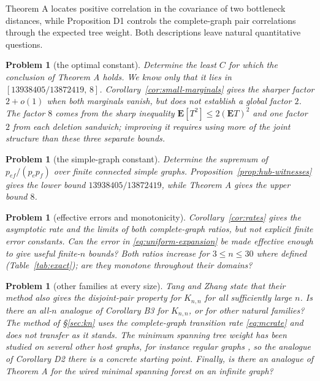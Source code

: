\documentclass[10pt,a4paper]{amsart}
\newtheorem{problem}[theorem]{Problem}
\newcommand{\E}{\mathbf{E}}
\begin{document}
Theorem A locates positive correlation in the covariance of two bottleneck
distances, while Proposition D1 controls the complete-graph pair correlations
through the expected tree weight. Both descriptions leave natural quantitative
questions.

\begin{problem}[the optimal constant]
Determine the least $C$ for which the conclusion of Theorem A holds. We know only
that it lies in $[13938405/13872419,\,8]$. Corollary~\ref{cor:small-marginals} gives
the sharper factor $2+o(1)$ when both marginals vanish, but does not establish a
global factor $2$. The factor $8$ comes from the sharp inequality
$\E[T^2]\le2(\E T)^2$ and one factor $2$ from each deletion sandwich; improving
it requires using more of the joint structure than these three separate bounds.
\end{problem}

\begin{problem}[the simple-graph constant]
Determine the supremum of $p_{ef}/(p_ep_f)$ over finite connected simple graphs.
Proposition~\ref{prop:hub-witnesses} gives the lower bound
$13938405/13872419$, while Theorem A gives the upper bound $8$.
\end{problem}

\begin{problem}[effective errors and monotonicity]
Corollary~\ref{cor:rates} gives the asymptotic rate and the limits of both
complete-graph ratios, but not explicit finite error constants. Can the error in
\eqref{eq:uniform-expansion} be made effective enough to give useful finite-$n$
bounds? Both ratios increase for $3\le n\le30$ where defined
(Table~\ref{tab:exact}); are they monotone throughout their domains?
\end{problem}

\begin{problem}[other families at every size]
Tang and Zhang \cite[Remark 1.2]{TZ} state that their method also gives the
disjoint-pair property for $K_{n,n}$ for all sufficiently large $n$. Is there an
all-$n$ analogue of Corollary B3 for $K_{n,n}$, or for other natural families?
The method of \S\ref{sec:kn} uses the complete-graph transition rate
\eqref{eq:mcrate} and does not transfer as it stands. The minimum spanning tree
weight has been studied on several other host graphs, for instance regular graphs
\cite{BFM}, so the analogue of Corollary D2 there is a concrete starting point.
Finally, is there an analogue of Theorem A for the wired minimal spanning forest
on an infinite graph?
\end{problem}
\end{document}
